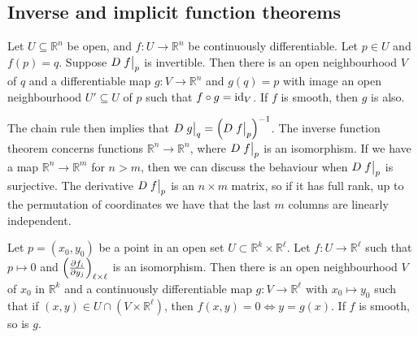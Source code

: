 \subsection{Inverse and implicit function theorems}
\begin{theorem}
	Let \( U \subseteq \mathbb R^n \) be open, and \( f \colon U \to \mathbb R^n \) be continuously differentiable.
	Let \( p \in U \) and \( f(p) = q \).
	Suppose \( D\eval{f}_p \) is invertible.
	Then there is an open neighbourhood \( V \) of \( q \) and a differentiable map \( g \colon V \to \mathbb R^n \) and \( g(q) = p \) with image an open neighbourhood \( U' \subseteq U \) of \( p \) such that \( f \circ g = \operatorname{id}_V \).
	If \( f \) is smooth, then \( g \) is also.
\end{theorem}
\begin{remark}
	The chain rule then implies that \( D\eval{g}_q = \qty(D\eval{f}_p)^{-1} \).
	The inverse function theorem concerns functions \( \mathbb R^n \to \mathbb R^n \), where \( D\eval{f}_p \) is an isomorphism.
	If we have a map \( \mathbb R^n \to \mathbb R^m \) for \( n > m \), then we can discuss the behaviour when \( D\eval{f}_p \) is surjective.
	The derivative \( D\eval{f}_p \) is an \( n \times m \) matrix, so if it has full rank, up to the permutation of coordinates we have that the last \( m \) columns are linearly independent.
\end{remark}
\begin{theorem}
	Let \( p = (x_0, y_0) \) be a point in an open set \( U \subset \mathbb R^k \times \mathbb R^\ell \).
	Let \( f \colon U \to \mathbb R^\ell \) such that \( p \mapsto 0 \) and \( \qty(\pdv{f_i}{y_j})_{\ell \times \ell} \) is an isomorphism.
	Then there is an open neighbourhood \( V \) of \( x_0 \) in \( \mathbb R^k \) and a continuously differentiable map \( g \colon V \to \mathbb R^\ell \) with \( x_0 \mapsto y_0 \) such that if \( (x,y) \in U \cap (V \times \mathbb R^\ell) \), then \( f(x,y)=0\iff y=g(x) \).
	If \( f \) is smooth, so is \( g \).
\end{theorem}

